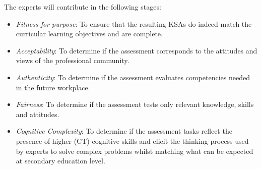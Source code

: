 The experts will contribute in the following stages:
\begin{itemize}
\item \emph{Fitness for purpose}: To ensure that the resulting KSAs do indeed match the curricular learning objectives and are complete.
\item \emph{Acceptability}: To determine if the assessment corresponds to the attitudes and views of the professional community.
\item \emph{Authenticity}: To determine if the assessment evaluates competencies needed in the future workplace.

\item \emph{Fairness}: To determine if the assessment tests only relevant knowledge, skills and attitudes.
\item \emph{Cognitive Complexity}: To determine if the assessment tasks reflect the presence of higher (CT) cognitive skills and elicit the thinking process used by experts to solve complex problems whilst matching what can be expected at secondary education level.
\end{itemize}





%


%



